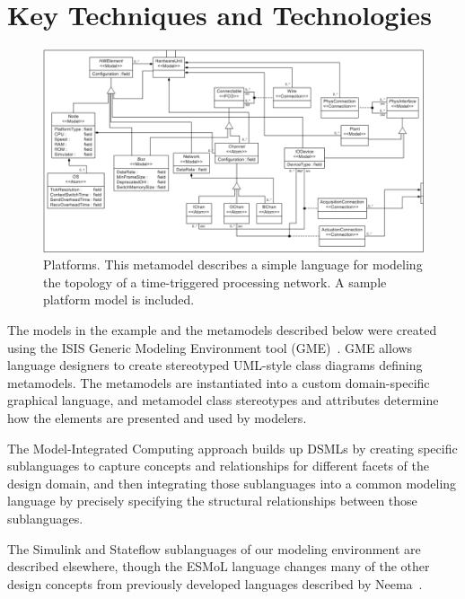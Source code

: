 \section{Key Techniques and Technologies}
\label{sect:esmolkey}

\begin{figure}
	\centering
	\includegraphics[width=0.8\columnwidth]{figures/platform.png}
	\caption{Platforms. This metamodel describes a simple language for modeling the topology of a time-triggered processing network.  A sample platform model is included.}
	\label{fig:platform}
\end{figure}

The models in the example and the metamodels described below were created using the ISIS Generic 
Modeling Environment tool (GME)~\cite{mic:gme}.  GME allows language designers to create 
stereotyped UML-style class diagrams defining metamodels.  The metamodels are instantiated into a 
custom domain-specific graphical language, and metamodel class stereotypes and attributes determine how the elements are 
presented and used by modelers. 

The Model-Integrated Computing approach\cite{mic:overview} builds up DSMLs by creating specific
sublanguages to capture concepts and relationships for different facets of the
design domain, and then integrating those sublanguages into a common modeling
language by precisely specifying the structural relationships between those 
sublanguages.



The Simulink and Stateflow sublanguages of our modeling environment are described elsewhere, though the 
ESMoL language changes many of the other design concepts from previously developed languages described by 
Neema~\cite{mic:ecsldp}.

